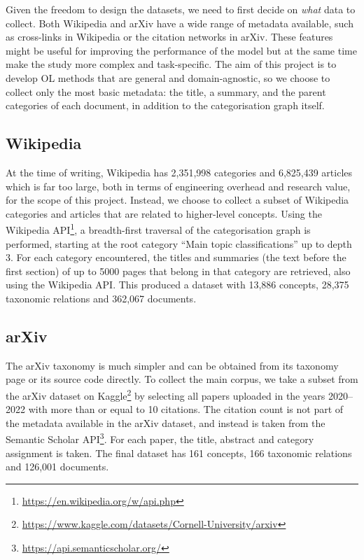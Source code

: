 Given the freedom to design the datasets, we need to first decide on \emph{what} data to collect. Both Wikipedia and arXiv have a wide range of metadata available, such as cross-links in Wikipedia or the citation networks in arXiv. These features might be useful for improving the performance of the model but at the same time make the study more complex and task-specific. The aim of this project is to develop OL methods that are general and domain-agnostic, so we choose to collect only the most basic metadata: the title, a summary, and the parent categories of each document, in addition to the categorisation graph itself.

\subsection{Wikipedia}

At the time of writing, Wikipedia has 2,351,998 categories and 6,825,439 articles which is far too large, both in terms of engineering overhead and research value, for the scope of this project. Instead, we choose to collect a subset of Wikipedia categories and articles that are related to higher-level concepts. Using the Wikipedia API\footnote{\url{https://en.wikipedia.org/w/api.php}}, a breadth-first traversal of the categorisation graph is performed, starting at the root category ``Main topic classifications'' up to depth 3. For each category encountered, the titles and summaries (the text before the first section) of up to 5000 pages that belong in that category are retrieved, also using the Wikipedia API. This produced a dataset with 13,886 concepts, 28,375 taxonomic relations and 362,067 documents.

\subsection{arXiv}

The arXiv taxonomy is much simpler and can be obtained from its taxonomy page or its source code directly. To collect the main corpus, we take a subset from the arXiv dataset on Kaggle\footnote{\url{https://www.kaggle.com/datasets/Cornell-University/arxiv}} by selecting all papers uploaded in the years 2020--2022 with more than or equal to 10 citations. The citation count is not part of the metadata available in the arXiv dataset, and instead is taken from the Semantic Scholar API\footnote{\url{https://api.semanticscholar.org/}}. For each paper, the title, abstract and category assignment is taken. The final dataset has 161 concepts, 166 taxonomic relations and 126,001 documents.

